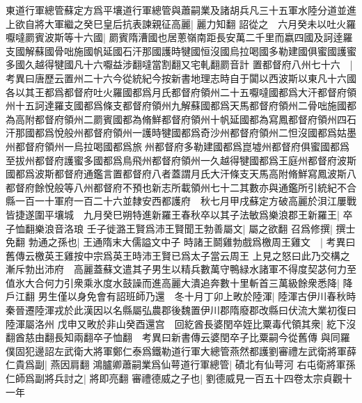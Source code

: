 東道行軍總管蘇定方爲平壤道行軍總管與蕭嗣業及諸胡兵凡三十五軍水陸分道並進上欲自將大軍繼之癸巳皇后抗表諫親征高麗|{
	麗力知翻}
詔從之　六月癸未以吐火羅嚈噠罽賓波斯等十六國|{
	罽賓隋漕國也居蔥嶺南距長安萬二千里而嬴四國及訶逹羅支國解蘇國骨咄施國帆延國石汗那國護時犍國恒沒國烏拉喝國多勒建國俱蜜國護蜜多國久越得犍國凡十六嚈益涉翻噠當割翻又宅軋翻罽音計}
置都督府八州七十六　|{
	考異曰唐歷云置州二十六今從統紀今按新書地理志時自于闐以西波斯以東凡十六國各以其王都爲都督府吐火羅國都爲月氏都督府領州二十五嚈噠國都爲大汗都督府領州十五訶達羅支國都爲條支都督府領州九解蘇國都爲天馬都督府領州二骨咄施國都為高附都督府領州二罽賓國都為脩鮮都督府領州十帆延國都為寫鳳都督府領州四石汗那國都爲悅般州都督府領州一護時犍國都爲奇沙州都督府領州二怛沒國都爲姑墨州都督府領州一烏拉喝國都爲旅州都督府多勒建國都爲崑墟州都督府俱蜜國都爲至拔州都督府護蜜多國都爲鳥飛州都督府領州一久越得犍國都爲王庭州都督府波斯國都爲波斯都督府通鑑言置都督府八者蓋謂月氏大汗條支天馬高附脩鮮寫鳳波斯八都督府餘悅般等八州都督府不預也新志所載領州七十二其數亦與通鑑所引統紀不合}
縣一百一十軍府一百二十六並隸安西都護府　秋七月甲戌蘇定方破高麗於浿江屢戰皆捷遂圍平壤城　九月癸巳朔特進新羅王春秋卒以其子法敏爲樂浪郡王新羅王|{
	卒子恤翻樂浪音洛琅}
壬子徙潞王賢爲沛王賢聞王勃善屬文|{
	屬之欲翻}
召爲修撰|{
	撰士免翻}
勃通之孫也|{
	王通隋末大儒謚文中子}
時諸王鬬雞勃戲爲檄周王雞文　|{
	考異曰舊傳云檄英王雞按中宗爲英王時沛王賢已爲太子當云周王}
上見之怒曰此乃交構之漸斥勃出沛府　高麗蓋蘇文遣其子男生以精兵數萬守鴨緑水諸軍不得度契苾何力至值氷大合何力引衆乘氷度水鼓譟而進高麗大潰追奔數十里斬首三萬級餘衆悉降|{
	降戶江翻}
男生僅以身免會有詔班師乃還　冬十月丁卯上畋於陸渾|{
	陸渾古伊川春秋時秦晉遷陸渾戎於此漢因以名縣屬弘農郡後魏置伊川郡隋廢郡改縣曰伏流大業初復曰陸渾屬洛州}
戊申又畋於非山癸酉還宫　回紇酋長婆閏卒姪比粟毒代領其衆|{
	紇下沒翻酋慈由翻長知兩翻卒子恤翻　考異曰新書傳云婆閏卒子比粟嗣今從舊傳}
與同羅僕固犯邊詔左武衛大將軍鄭仁泰爲鐵勒道行軍大總管燕然都護劉審禮左武衛將軍薛仁貴爲副|{
	燕因肩翻}
鴻臚卿蕭嗣業爲仙萼道行軍總管|{
	磧北有仙萼河}
右屯衛將軍孫仁師爲副將兵討之|{
	將即亮翻}
審禮德威之子也|{
	劉德威見一百五十四卷太宗貞觀十一年}



